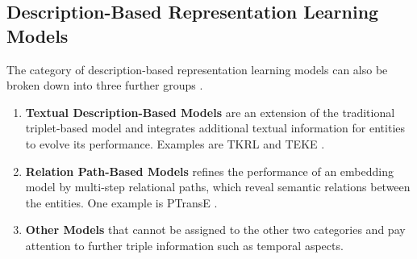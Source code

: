 \subsection{Description-Based Representation Learning Models}
\label{subsec:description_based_representation_learning_models}

The category of description-based representation learning models can also be broken down into three further groups \cite{electronics9050750}.
\begin{enumerate}
    \item 
    \textbf{Textual Description-Based Models} are an extension of the traditional triplet-based model and integrates additional textual information for entities to evolve its performance.
    Examples are \ac{TKRL} \cite{TKRL} and \ac{TEKE} \cite{TEKE}.
    
    \item 
    \textbf{Relation Path-Based Models} refines the performance of an embedding model by multi-step relational paths, which reveal semantic relations between the entities.
    One example is \ac{PTransE} \cite{PTransE}.
    
    \item 
    \textbf{Other Models} that cannot be assigned to the other two categories and pay attention to further triple information such as temporal aspects.
\end{enumerate}